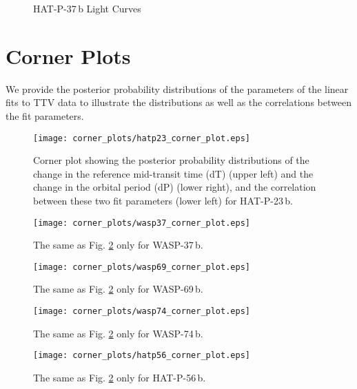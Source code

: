 \documentclass[a4paper,fleqn,usenatbib]{mnras}
\begin{document}
{{%
\begin{figure}
  \centering
  \hfill
    \caption{HAT-P-37\,b Light Curves}
    \label{fig:hatp37_lightcurves}
\end{figure}

\section{Corner Plots}
\label{sec:appendixb}

We provide the posterior probability distributions of the parameters of the linear fits to TTV data to illustrate the distributions as well as the correlations between the fit parameters.

\begin{figure}
  \centering
  \texttt{[image: corner\_plots/hatp23\_corner\_plot.eps]}
  \caption{Corner plot showing the posterior probability distributions of the change in the reference mid-transit time (dT) (upper left) and the change in the orbital period (dP) (lower right), and the correlation between these two fit parameters (lower left) for HAT-P-23\,b.}
  \label{fig:hatp23_corner_plot}
\end{figure}

\begin{figure}
  \centering
  \texttt{[image: corner\_plots/wasp37\_corner\_plot.eps]}
  \caption{The same as Fig. \ref{fig:hatp23_corner_plot} only for WASP-37\,b.}
  \label{fig:wasp37_corner_plot}
\end{figure}

\begin{figure}
  \centering
  \texttt{[image: corner\_plots/wasp69\_corner\_plot.eps]}
  \caption{The same as Fig. \ref{fig:hatp23_corner_plot} only for WASP-69\,b.}
  \label{fig:wasp69_corner_plot}
\end{figure}

\begin{figure}
  \centering
  \texttt{[image: corner\_plots/wasp74\_corner\_plot.eps]}
  \caption{The same as Fig. \ref{fig:hatp23_corner_plot}  only for WASP-74\,b.}
  \label{fig:wasp74_corner_plot}
\end{figure}

\begin{figure}
  \centering
  \texttt{[image: corner\_plots/hatp56\_corner\_plot.eps]}
  \caption{The same as Fig. \ref{fig:hatp23_corner_plot} only for HAT-P-56\,b.}
  \label{fig:hatp56_corner_plot}
\end{figure}

}}
\end{document}

